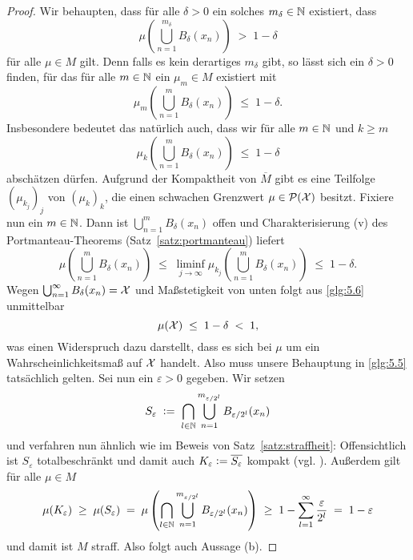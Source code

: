 \documentclass[../thesis/thesis.tex]{subfiles}
\begin{document}
\begin{proof}
		Wir behaupten, dass für alle $\delta > 0$ ein solches $m_\delta \in \mathbb{N}$ existiert, dass
		\[ \mu \left(\bigcup_{n=1}^{m_\delta} B_\delta(x_n) \right) \; > \; 1 - \delta \label{glg:5.5} \tag{5.5} \]
		für alle $\mu \in M$ gilt. Denn falls es kein derartiges $m_\delta$ gibt, so lässt sich ein $\delta > 0$ finden, für das
		für alle $m \in \mathbb{N}$ ein $\mu_m \in M$ existiert mit
		\[ \mu_m \left(\bigcup_{n=1}^{m} B_\delta(x_n) \right) \; \leq \; 1 - \delta \text{.} \]
		Insbesondere bedeutet das natürlich auch, dass wir für alle $m \in \mathbb{N}$ und $k \geq m$ 
		\[ \mu_k \left(\bigcup_{n=1}^{m} B_\delta(x_n) \right) \; \leq \; 1 - \delta \]
		abschätzen dürfen. Aufgrund der Kompaktheit von $\overline{M}$ gibt es eine Teilfolge $(\mu_{k_j})_j$ von $(\mu_k)_k$, 
		die einen schwachen Grenzwert $\mu \in \mathcal{P}(\mathcal{X})$ besitzt. Fixiere nun ein $m \in \mathbb{N}$. 
		Dann ist $\bigcup_{n=1}^{m} B_\delta(x_n)$
		offen und Charakterisierung (v) des Portmanteau-Theorems (Satz~\ref{satz:portmanteau}) liefert
		\[ \mu \left(\bigcup_{n=1}^{m} B_\delta(x_n) \right) 
		\; \leq \; \liminf_{j \to \infty} \mu_{k_j} \left(\bigcup_{n=1}^{m} B_\delta(x_n) \right) 
		\; \leq \; 1 - \delta \text{.} \label{glg:5.6} \tag{5.6} \]
		Wegen $\bigcup_{n=1}^{\infty} B_\delta(x_n) = \mathcal{X}$ und Maßstetigkeit von unten 
		folgt aus \eqref{glg:5.6} unmittelbar 
		\[ \mu(\mathcal{X}) \; \leq \; 1 - \delta \; < \; 1 \text{,} \]
		was einen Widerspruch dazu darstellt, dass es sich bei $\mu$ um ein 
		Wahrscheinlichkeitsmaß auf $\mathcal{X}$ handelt. Also muss unsere Behauptung in \eqref{glg:5.5} tatsächlich gelten.
		Sei nun ein $\varepsilon > 0$ gegeben. Wir setzen 
		\[ S_\varepsilon 
		\; \vcentcolon = \; \bigcap_{l \in \mathbb{N}} \bigcup_{n=1}^{m_{\varepsilon / 2^l}} 
		B_{\varepsilon / 2^l}(x_n) \]
		und verfahren nun ähnlich wie im Beweis von Satz~\ref{satz:straffheit}: Offensichtlich ist $S_\varepsilon$ totalbeschränkt und damit auch 
		$ K_\varepsilon \vcentcolon = \overline{S_\varepsilon}$ kompakt (vgl. \cite[Theorem 2.3.8]{Simon.2015}). 
		Außerdem gilt für alle $\mu \in M$
		\[
		\mu(K_\varepsilon) \; \geq \; \mu(S_\varepsilon) \; = \; \mu\left(\bigcap_{l \in \mathbb{N}} \bigcup_{n=1}^{m_{\varepsilon / 2^l}} 
		B_{\varepsilon / 2^l}(x_n)\right)
		\; \geq \; 1 - \sum_{l=1}^{\infty} \frac{\varepsilon}{2^l} \; = \; 1 - \varepsilon
		\]
		und damit ist $M$ straff. Also folgt auch Aussage (b).
	\end{proof}
	
\end{document}
